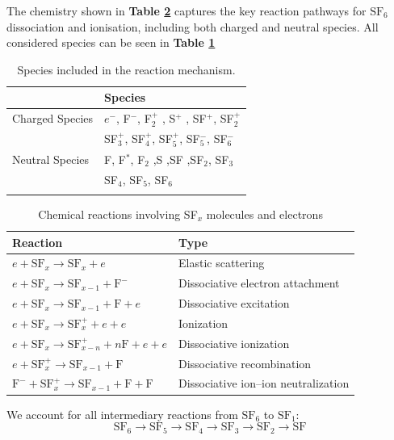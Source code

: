 \documentclass[12pt]{article}
\begin{document}
The chemistry shown in \textbf{Table \ref{tab:nfx_reactions}} captures the key reaction pathways for $\text{SF}_6$ dissociation and ionisation, including both charged and neutral species. All considered species can be seen in \textbf{Table \ref{tab:species}}


\begin{table}[h!]
\centering
\caption{Species included in the reaction mechanism.}
\begin{tabular}{ll}
\hline
\textbf{} & \textbf{Species} \\
\hline
Charged Species & $e^{-}$, F$^{-}$, F$_2^{+}$ , S$^{+}$ , SF$^{+}$, SF$_2^{+}$ \\ &  SF$_3^{+}$, SF$_4^{+}$, SF$_5^{+}$, SF$_5^{-}$, SF$_6^{-}$ \\
Neutral Species & F, F$^{*}$, F$_2$ ,S ,SF ,SF$_2$, SF$_3$\\ & SF$_4$, SF$_5$, SF$_6$ \\
\hline
\label{tab:species}
\end{tabular}
\end{table}

\begin{table}[h]
\centering
\begin{tabular}{ll}
\hline
\textbf{Reaction} & \textbf{Type} \\
\hline
$e + \text{SF}_x \rightarrow \text{SF}_x + e$ & Elastic scattering \\
$e + \text{SF}_x \rightarrow \text{SF}_{x-1} + \text{F}^-$ & Dissociative electron attachment \\
$e + \text{SF}_x \rightarrow \text{SF}_{x-1} + \text{F} + e$ & Dissociative excitation \\
$e + \text{SF}_x \rightarrow \text{SF}_x^+ + e + e$ & Ionization \\
$e + \text{SF}_x \rightarrow \text{SF}_{x-n}^+ + n\text{F} + e + e$ & Dissociative ionization \\
$e + \text{SF}_x^+ \rightarrow \text{SF}_{x-1} + \text{F}$ & Dissociative recombination \\
$\text{F}^- + \text{SF}_x^+ \rightarrow \text{SF}_{x-1} + \text{F} + \text{F}$ & Dissociative ion–ion neutralization \\
\hline
\end{tabular}
\caption{Chemical reactions involving SF$_x$ molecules and electrons}
\label{tab:nfx_reactions}
\end{table}

We account for all intermediary reactions from $\text{SF}_6$ to $\text{SF}_1$:
\begin{equation}
\text{SF}_6 \rightarrow \text{SF}_5 \rightarrow \text{SF}_4 \rightarrow \text{SF}_3 \rightarrow \text{SF}_2 \rightarrow \text{SF}
\end{equation}
\end{document}
